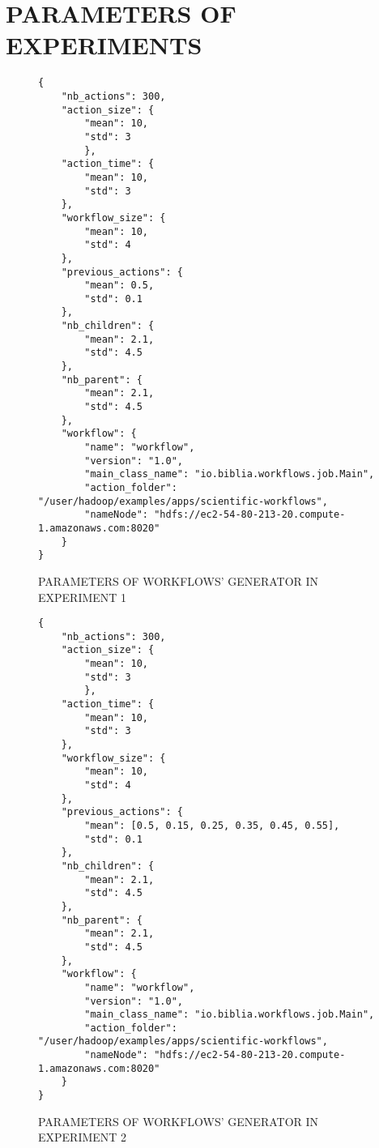 \chapter{PARAMETERS OF EXPERIMENTS}
\newpage
\label{app:experiment_1_parameters}
\begin{figure}
\begin{singlespace}
\begin{mdframed}
\begin{verbatim}
{
	"nb_actions": 300,
	"action_size": {
		"mean": 10,
		"std": 3
		},
	"action_time": {
		"mean": 10, 
		"std": 3
	},
	"workflow_size": {
		"mean": 10,
		"std": 4
	},
	"previous_actions": {
		"mean": 0.5,
		"std": 0.1
	},
	"nb_children": {
		"mean": 2.1,
		"std": 4.5
	},
	"nb_parent": {
		"mean": 2.1,
		"std": 4.5
	},
	"workflow": {
		"name": "workflow",
		"version": "1.0",
		"main_class_name": "io.biblia.workflows.job.Main",
		"action_folder": "/user/hadoop/examples/apps/scientific-workflows",
		"nameNode": "hdfs://ec2-54-80-213-20.compute-1.amazonaws.com:8020"
	}
}
\end{verbatim}
\end{mdframed}

\caption{PARAMETERS OF WORKFLOWS' GENERATOR IN EXPERIMENT 1}
\label{fig:parameters_generator_experiment_1}
\end{singlespace}
\end{figure} 


\label{app:experiment_2_parameters}
\begin{figure}
\begin{singlespace}
\begin{mdframed}
\begin{verbatim}
{
	"nb_actions": 300,
	"action_size": {
		"mean": 10,
		"std": 3
		},
	"action_time": {
		"mean": 10, 
		"std": 3
	},
	"workflow_size": {
		"mean": 10,
		"std": 4
	},
	"previous_actions": {
		"mean": [0.5, 0.15, 0.25, 0.35, 0.45, 0.55],
		"std": 0.1
	},
	"nb_children": {
		"mean": 2.1,
		"std": 4.5
	},
	"nb_parent": {
		"mean": 2.1,
		"std": 4.5
	},
	"workflow": {
		"name": "workflow",
		"version": "1.0",
		"main_class_name": "io.biblia.workflows.job.Main",
		"action_folder": "/user/hadoop/examples/apps/scientific-workflows",
		"nameNode": "hdfs://ec2-54-80-213-20.compute-1.amazonaws.com:8020"
	}
}
\end{verbatim}
\end{mdframed}

\caption{PARAMETERS OF WORKFLOWS' GENERATOR IN EXPERIMENT 2}
\label{fig:parameters_generator_experiment_2}
\end{singlespace}
\end{figure} 

